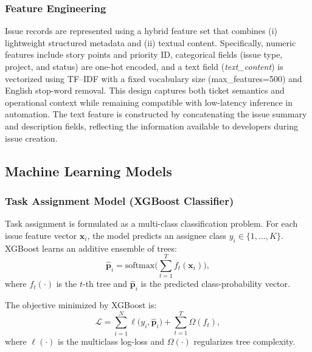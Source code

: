 \documentclass[conference]{IEEEtran}
\begin{document}
\subsubsection{Feature Engineering}
Issue records are represented using a hybrid feature set that combines (i) lightweight structured metadata and (ii) textual content. Specifically, numeric features include story points and priority ID, categorical fields (issue type, project, and status) are one-hot encoded, and a text field (\textit{text\_content}) is vectorized using TF--IDF with a fixed vocabulary size (max\_features=500) and English stop-word removal. This design captures both ticket semantics and operational context while remaining compatible with low-latency inference in automation. The text feature is constructed by concatenating the issue summary and description fields, reflecting the information available to developers during issue creation. 

\subsection{Machine Learning Models}

\subsubsection{Task Assignment Model (XGBoost Classifier)}
Task assignment is formulated as a multi-class classification problem. For each issue feature vector $\mathbf{x}_i$, the model predicts an assignee class $y_i \in \{1,\dots,K\}$. XGBoost learns an additive ensemble of trees:
\begin{equation}
\hat{\mathbf{p}}_i = \mathrm{softmax}\Big(\sum_{t=1}^{T} f_t(\mathbf{x}_i)\Big),
\label{eq:xgb_pred}
\end{equation}
where $f_t(\cdot)$ is the $t$-th tree and $\hat{\mathbf{p}}_i$ is the predicted class-probability vector.

The objective minimized by XGBoost is:
\begin{equation}
\mathcal{L} = \sum_{i=1}^{N} \ell\big(y_i,\hat{\mathbf{p}}_i\big) + \sum_{t=1}^{T}\Omega(f_t),
\label{eq:xgb_obj}
\end{equation}
where $\ell(\cdot)$ is the multiclass log-loss and $\Omega(\cdot)$ regularizes tree complexity.
\end{document}
